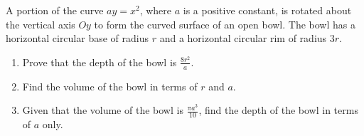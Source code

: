 \begin{problem}
    A portion of the curve $ay = x^2$, where $a$ is a positive constant, is rotated about the vertical axis $Oy$ to form the curved surface of an open bowl. The bowl has a horizontal circular base of radius $r$ and a horizontal circular rim of radius $3r$.

    \begin{enumerate}
        \item Prove that the depth of the bowl is $\frac{8r^2}a$.
        \item Find the volume of the bowl in terms of $r$ and $a$.
        \item Given that the volume of the bowl is $\frac{\pi a^3}{10}$, find the depth of the bowl in terms of $a$ only.
    \end{enumerate}
\end{problem}
